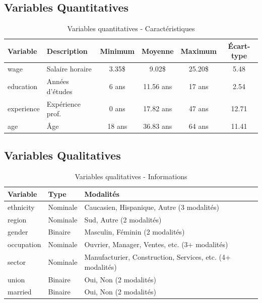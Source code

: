 \documentclass[12pt,a4paper]{report}
\begin{document}
\subsection{Variables Quantitatives}

\begin{table}[H]
\centering
\caption{Variables quantitatives - Caractéristiques}
\begin{tabular}{|l|p{3.5cm}|c|c|c|c|}
\hline
\textbf{Variable} & \textbf{Description} & \textbf{Minimum} & \textbf{Moyenne} & \textbf{Maximum} & \textbf{Écart-type} \\
\hline
wage & Salaire horaire & 3.35\$ & 9.02\$ & 25.20\$ & 5.48 \\
\hline
education & Années d'études & 6 ans & 11.56 ans & 17 ans & 2.54 \\
\hline
experience & Expérience prof. & 0 ans & 17.82 ans & 47 ans & 12.71 \\
\hline
age & Âge & 18 ans & 36.83 ans & 64 ans & 11.41 \\
\hline
\end{tabular}
\end{table}

\subsection{Variables Qualitatives}

\begin{table}[H]
\centering
\caption{Variables qualitatives - Informations}
\begin{tabular}{|l|p{4cm}|p{5cm}|}
\hline
\textbf{Variable} & \textbf{Type} & \textbf{Modalités} \\
\hline
ethnicity & Nominale & Caucasien, Hispanique, Autre (3 modalités) \\
\hline
region & Nominale & Sud, Autre (2 modalités) \\
\hline
gender & Binaire & Masculin, Féminin (2 modalités) \\
\hline
occupation & Nominale & Ouvrier, Manager, Ventes, etc. (3+ modalités) \\
\hline
sector & Nominale & Manufacturier, Construction, Services, etc. (4+ modalités) \\
\hline
union & Binaire & Oui, Non (2 modalités) \\
\hline
married & Binaire & Oui, Non (2 modalités) \\
\hline
\end{tabular}
\end{table}
\end{document}

